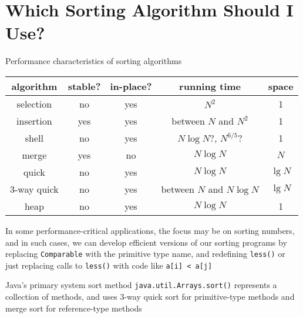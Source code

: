 \documentclass[8pt,a4paper,compress]{beamer}
\begin{document}
\section{Which Sorting Algorithm Should I Use?}
\begin{frame}[fragile]
\pause

Performance characteristics of sorting algorithms
\begin{center}
\begin{tabular}{ccccc}
algorithm & stable? & in-place? & running time & space \\ \hline
selection & no & yes & $N^2$ & 1 \\
insertion & yes & yes & between $N$ and $N^2$ & 1 \\
shell & no & yes & $N\log N$?, $N^{6/5}$? & 1 \\
merge & yes & no & $N\log N$ & $N$ \\
quick & no & yes & $N\log N$ & $\lg N$ \\
3-way quick & no & yes & between $N$ and $N\log N$ & $\lg N$ \\
heap & no & yes & $N\log N$ & 1
\end{tabular} 
\end{center}

\pause
\bigskip

In some performance-critical applications, the focus may be on sorting numbers, and in such cases, we can develop efficient versions of our sorting programs by replacing \lstinline$Comparable$ with the primitive type name, and redefining \lstinline$less()$ or just replacing calls to \lstinline$less()$ with code like \lstinline$a[i] < a[j]$

\pause
\bigskip

Java's primary system sort method  \lstinline$java.util.Arrays.sort()$ represents a collection of methods, and uses 3-way quick sort for primitive-type methods and merge sort for reference-type methods
\end{frame}
\end{document}
